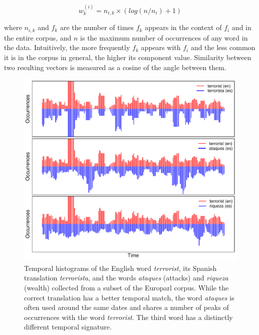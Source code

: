 \documentclass[11pt]{article}
\begin{document}
\begin{equation*}
w_{k}^{(i)} = n_{i,k} \times (log( {n / n_{i}}) + 1)
\end{equation*}

\noindent where $n_{i,k}$ and $f_{k}$ are the number of times $f_{k}$ appears in the context of $f_{i}$ and in the entire corpus, and $n$ is the maximum number of occurrences of any word in the data.  Intuitively, the more frequently $f_{k}$ appears with $f_{i}$ and the less common it is in the corpus in general, the higher its component value.  Similarity between two resulting vectors is measured as a cosine of the angle between them.\\

\begin{figure}[t]
\includegraphics[width= \linewidth]{../figures/temporal/temporal}
\caption{Temporal histograms of the English word {\em terrorist}, its Spanish translation {\em terrorista}, and the words {\em ataques}  (attacks) and {\em riqueza} (wealth) collected from a subset of the Europarl corpus. While the correct translation has a better temporal match, the word {\em ataques} is often used around the same dates and shares a number of peaks of occurrences with the word {\em terrorist}.  The third word has a distinctly different temporal signature.}
\label{fig:temporal}
\end{figure}
\end{document}

